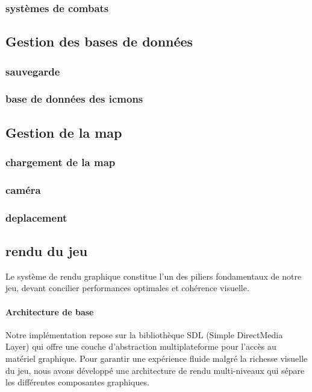 \documentclass[12pt,a4paper, twoside]{article}
\begin{document}
    \subsubsection{systèmes de combats}

\subsection{Gestion des bases de données}
    \subsubsection{sauvegarde}
    \subsubsection{base de données des icmons}

\subsection{Gestion de la map}
    \subsubsection{chargement de la map}
    \subsubsection{caméra}
    \subsubsection{deplacement}
\newpage
\subsection{rendu du jeu}
Le système de rendu graphique constitue l'un des piliers fondamentaux de notre jeu, devant concilier performances optimales et cohérence visuelle.

\paragraph{Architecture de base} Notre implémentation repose sur la bibliothèque SDL (Simple DirectMedia Layer) qui offre une couche d'abstraction multiplateforme pour l'accès au matériel graphique. Pour garantir une expérience fluide malgré la richesse visuelle du jeu, nous avons développé une architecture de rendu multi-niveaux qui sépare les différentes composantes graphiques.
\end{document}
